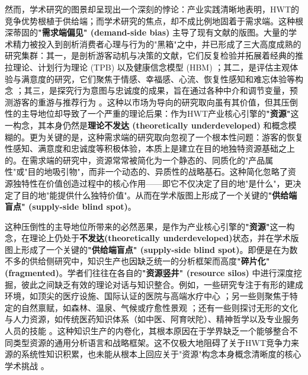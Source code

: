 \documentclass[UTF8, 12pt, a4paper, twoside]{ctexart}
\begin{document}
然而，学术研究的图景却呈现出一个深刻的悖论：产业实践清晰地表明，HWT的竞争优势根植于供给端；而学术研究的焦点，却不成比例地固着于需求端。这种根深蒂固的\textbf{"需求端偏见" (demand-side bias)} 主导了现有文献的版图。大量的学术精力被投入到剖析消费者心理与行为的"黑箱"之中，并已形成了三大高度成熟的研究集群：其一，是剖析游客动机与决策的文献，它们反复检验并拓展着经典的推拉理论、计划行为理论 (TPB) 以及健康信念模型 (HBM) \parencite{kainthola2024motivations, lim2016visitor, seow2017intention, ban2020applying, chaulagain2020traveling}；其二，是评估主观体验与满意度的研究，它们聚焦于情感、幸福感、心流、恢复性感知和难忘体验等构念 \parencite{al-ansi2025wellness, eck2024enhancing, xia2024relationships, luo2018towards, backman2022engaging}；其三，是探究行为意图与忠诚度的成果，旨在通过各种中介和调节变量，预测游客的重游与推荐行为 \parencite{han2018role, jeong2020sustaining, chua2024wellness}。这种以市场为导向的研究取向虽有其价值，但其压倒性的主导地位却导致了一个严重的理论后果：作为HWT产业核心引擎的\textbf{"资源"}这一构念，其本身仍然是\textbf{理论不发达 (theoretically underdeveloped)} 和概念模糊的。更为关键的是，这种需求端的研究取向忽视了一个根本性问题：游客的恢复性感知、满意度和忠诚度等积极体验，本质上是建立在目的地独特资源基础之上的。在需求端的研究中，资源常常被简化为一个静态的、同质化的"产品属性"或"目的地吸引物"，而非一个动态的、异质性的战略基石。这种简化忽略了资源独特性在价值创造过程中的核心作用——即它不仅决定了目的地"是什么"，更决定了目的地"能提供什么独特价值"。从而在学术版图上形成了一个关键的\textbf{"供给端盲点" (supply-side blind spot)}。

这种压倒性的主导地位所带来的必然恶果，是作为产业核心引擎的\textbf{"资源"}这一构念，在理论上仍处于\textbf{不发达(theoretically underdeveloped)}状态，并在学术版图上形成了一个关键的\textbf{"供给端盲点" (supply-side blind spot)}。即便是在为数不多的供给侧研究中，知识生产也因缺乏统一的分析框架而高度\textbf{"碎片化" (fragmented)}。学者们往往在各自的\textbf{"资源竖井" (resource silos)} 中进行深度挖掘，彼此之间缺乏有效的理论对话与知识整合。例如，一些研究专注于有形的建成环境，如顶尖的医疗设施、国际认证的医院与高端水疗中心 \parencite{connell2006medical, beganovic2021transformation, han2014medical}；另一些则聚焦于特定的自然禀赋，如森林、温泉、气候或疗愈性景观 \parencite{zoric2022developing, dryglas2023therapeutic, heung2013wellness, huang2018therapeutic}；还有一些则探讨无形的文化与人力资源，如传统医药知识体系（如中医、阿育吠陀）、精神哲学以及专业服务人员的技能 \parencite{chambers2008using, abbaspour2022designing, peng2025wellness}。这种知识生产的内卷化，其根本原因在于学界缺乏一个能够整合不同类型资源的通用分析语言和战略框架。这不仅极大地阻碍了关于HWT竞争力来源的系统性知识积累，也未能从根本上回应关于"资源"构念本身概念清晰度的核心学术挑战 \parencite{suddaby2010}。
\end{document}
